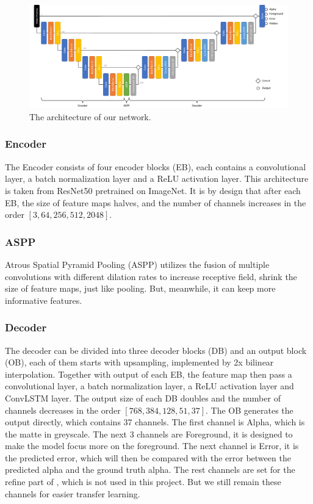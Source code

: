 \documentclass[final]{cvpr}
\begin{document}
\begin{figure}[t]
    \begin{center}
        \includegraphics[width=1\textwidth]{img/modelConvLSTM.pdf}
    \end{center}
    \caption{The architecture of our network.}
    \label{modelConvLSTM}
\end{figure}

\subsubsection{Encoder}

The Encoder consists of four encoder blocks (EB), each contains a convolutional layer, a batch normalization layer and a ReLU activation layer. This architecture is taken from ResNet50 pretrained on ImageNet. It is by design that after each EB, the size of feature maps halves, and the number of channels increases in the order $[3, 64, 256, 512, 2048]$.

\subsubsection{ASPP}

Atrous Spatial Pyramid Pooling (ASPP) utilizes the fusion of multiple convolutions with different dilation rates to increase receptive field, shrink the size of feature maps, just like pooling. But, meanwhile, it can keep more informative features.

\subsubsection{Decoder}

The decoder can be divided into three decoder blocks (DB) and an output block (OB), each of them starts with upsampling, implemented by 2x bilinear interpolation. Together with output of each EB, the feature map then pass a convolutional layer, a batch normalization layer, a ReLU activation layer and ConvLSTM layer. The output size of each DB doubles and the number of channels decreases in the order  $[768, 384, 128, 51, 37]$. The OB generates the output directly, which contains 37 channels. The first channel is Alpha, which is the matte in greyscale. The next 3 channels are Foreground, it is designed to make the model focus more on the foreground. The next channel is Error, it is the predicted error, which will then be compared with the error between the predicted alpha and the ground truth alpha. The rest channels are set for the refine part of \cite{linRealTimeHighResolutionBackground2020a}, which is not used in this project. But we still remain these channels for easier transfer learning.
\end{document}
